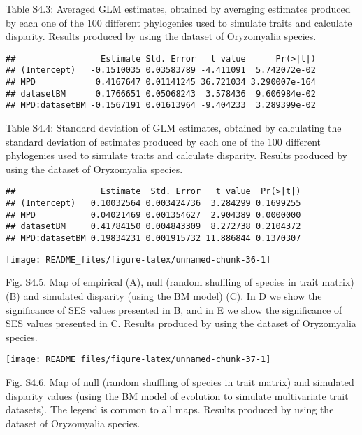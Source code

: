 \documentclass[
]{article}
\begin{document}
Table S4.3: Averaged GLM estimates, obtained by averaging estimates
produced by each one of the 100 different phylogenies used to simulate
traits and calculate disparity. Results produced by using the dataset of
Oryzomyalia species.

\begin{verbatim}
##                 Estimate Std. Error   t value      Pr(>|t|)
## (Intercept)   -0.1510035 0.03583789 -4.411091  5.742072e-02
## MPD            0.4167647 0.01141245 36.721034 3.290007e-164
## datasetBM      0.1766651 0.05068243  3.578436  9.606984e-02
## MPD:datasetBM -0.1567191 0.01613964 -9.404233  3.289399e-02
\end{verbatim}

Table S4.4: Standard deviation of GLM estimates, obtained by calculating
the standard deviation of estimates produced by each one of the 100
different phylogenies used to simulate traits and calculate disparity.
Results produced by using the dataset of Oryzomyalia species.

\begin{verbatim}
##                 Estimate  Std. Error   t value  Pr(>|t|)
## (Intercept)   0.10032564 0.003424736  3.284299 0.1699255
## MPD           0.04021469 0.001354627  2.904389 0.0000000
## datasetBM     0.41784150 0.004843309  8.272738 0.2104372
## MPD:datasetBM 0.19834231 0.001915732 11.886844 0.1370307
\end{verbatim}

\begin{center}\texttt{[image: README\_files/figure-latex/unnamed-chunk-36-1]} \end{center}

Fig. S4.5. Map of empirical (A), null (random shuffling of species in
trait matrix) (B) and simulated disparity (using the BM model) (C). In D
we show the significance of SES values presented in B, and in E we show
the significance of SES values presented in C. Results produced by using
the dataset of Oryzomyalia species.

\begin{center}\texttt{[image: README\_files/figure-latex/unnamed-chunk-37-1]} \end{center}

Fig. S4.6. Map of null (random shuffling of species in trait matrix) and
simulated disparity values (using the BM model of evolution to simulate
multivariate trait datasets). The legend is common to all maps. Results
produced by using the dataset of Oryzomyalia species.
\end{document}

